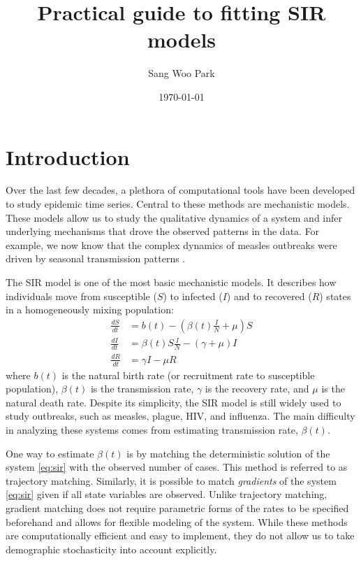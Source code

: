 \documentclass{article}
\title{Practical guide to fitting SIR models}
\date{\today}
\author{Sang Woo Park}
\begin{document}
\maketitle

\pagebreak

\tableofcontents

\pagebreak


\section{Introduction}

Over the last few decades, a plethora of computational tools have been developed to study epidemic time series.
Central to these methods are mechanistic models.
These models allow us to study the qualitative dynamics of a system and infer underlying mechanisms that drove the observed patterns in the data.
For example, we now know that the complex dynamics of measles outbreaks were driven by seasonal transmission patterns \citep{earn2000simple}.


The SIR model is one of the most basic mechanistic models. It describes how individuals move from susceptible ($S$) to infected ($I$) and to recovered ($R$) states in a homogeneously mixing population:
\begin{equation}\label{eq:sir}
\begin{aligned}
\frac{dS}{dt} &= b(t) - \left(\beta(t) \frac{I}{N} + \mu \right) S\\
\frac{dI}{dt} &= \beta(t) S \frac{I}{N} - (\gamma + \mu) I\\
\frac{dR}{dt} &= \gamma I - \mu R
\end{aligned}
\end{equation}
where $b(t)$ is the natural birth rate (or recruitment rate to susceptible population), $\beta(t)$ is the transmission rate, $\gamma$ is the recovery rate, and $\mu$ is the natural death rate.
Despite its simplicity, the SIR model is still widely used to study outbreaks, such as measles, plague, HIV, and influenza.
The main difficulty in analyzing these systems comes from estimating transmission rate, $\beta(t)$.

One way to estimate $\beta(t)$ is by matching the deterministic solution of the system \ref{eq:sir} with the observed number of cases.
This method is referred to as trajectory matching.
Similarly, it is possible to match \emph{gradients} of the system \ref{eq:sir} given if all state variables are observed.
Unlike trajectory matching, gradient matching does not require parametric forms of the rates to be specified beforehand and allows for flexible modeling of the system.
While these methods are computationally efficient and easy to implement, they do not allow us to take demographic stochasticity into account explicitly.
\end{document}
